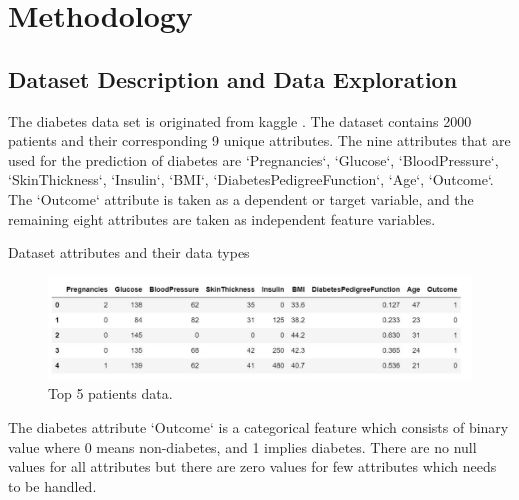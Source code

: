 \chapter{Methodology}
\label{ch:method} %
\section{Dataset Description and Data Exploration}
The diabetes data set is originated from kaggle \citep{dataset}. The dataset contains 2000 patients and their corresponding 9 unique attributes. The nine attributes that are used for the prediction of diabetes are `Pregnancies`, 
`Glucose`, `BloodPressure`, `SkinThickness`, `Insulin`, `BMI`, `DiabetesPedigreeFunction`, 
`Age`, `Outcome`. The `Outcome` attribute is taken as a dependent or target variable, and the remaining eight attributes are taken as independent feature variables. 
 \begin{table}[ht!]
    \centering
    \caption{Dataset attributes and their data types}
    
    \label{tab:table-03-data-info}
\end{table}

\begin{figure}[ht]
    \centering    \includegraphics[scale=0.8]{figures/data_top5.pdf}
    \caption{Top 5 patients data.}
    \label{fig:capture_b}
\end{figure}

The diabetes attribute `Outcome` is a categorical feature which consists of binary value where 0 means non-diabetes, and 1 implies diabetes. There are no null values for all attributes but there are zero values for few attributes which needs to be handled.

